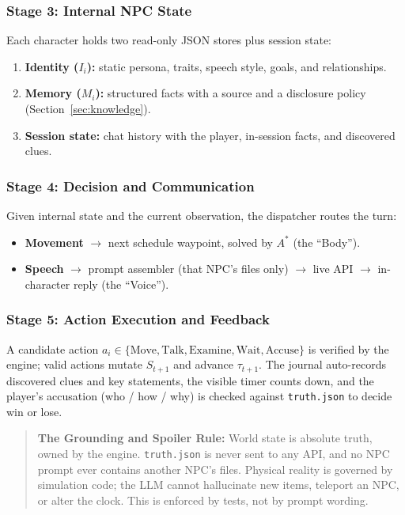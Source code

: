 \documentclass[11pt,a4paper]{article}
\begin{document}
\subsubsection{Stage 3: Internal NPC State}
Each character holds two read-only JSON stores plus session state:
\begin{enumerate}
    \item \textbf{Identity ($I_i$):} static persona, traits, speech style, goals, and relationships.
    \item \textbf{Memory ($M_i$):} structured facts with a source and a disclosure policy (Section~\ref{sec:knowledge}).
    \item \textbf{Session state:} chat history with the player, in-session facts, and discovered clues.
\end{enumerate}

\subsubsection{Stage 4: Decision and Communication}
Given internal state and the current observation, the dispatcher routes the turn:
\begin{itemize}
    \item \textbf{Movement} $\rightarrow$ next schedule waypoint, solved by $A^*$ (the ``Body'').
    \item \textbf{Speech} $\rightarrow$ prompt assembler (that NPC's files only) $\rightarrow$ live API $\rightarrow$ in-character reply (the ``Voice'').
\end{itemize}

\subsubsection{Stage 5: Action Execution and Feedback}
A candidate action $a_i \in \{\text{Move}, \text{Talk}, \text{Examine}, \text{Wait}, \text{Accuse}\}$ is verified by the engine; valid actions mutate $S_{t+1}$ and advance $\tau_{t+1}$. The journal auto-records discovered clues and key statements, the visible timer counts down, and the player's accusation (who / how / why) is checked against \texttt{truth.json} to decide win or lose.

\begin{quote}
\textbf{The Grounding and Spoiler Rule:} World state is absolute truth, owned by the engine. \texttt{truth.json} is never sent to any API, and no NPC prompt ever contains another NPC's files. Physical reality is governed by simulation code; the LLM cannot hallucinate new items, teleport an NPC, or alter the clock. This is enforced by tests, not by prompt wording.
\end{quote}
\end{document}
